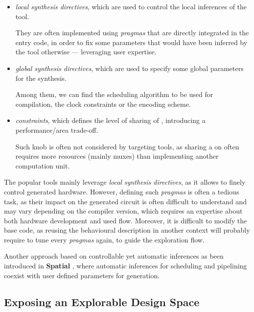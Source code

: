 \clearpage

        \begin{itemize}
            \item {\it local synthesis directives}, which are used to control the local inferences of the  tool.

                They are often implemented using {\it pragmas} that are directly integrated in the entry code, in order to fix some parameters that would have been inferred by the tool otherwise --- leveraging user expertise.
            \item {\it global synthesis directives}, which are used to specify some global parameters for the synthesis.

                Among them, we can find the scheduling algorithm to be used for compilation, the clock constraints or the  encoding scheme.
            \item {\it {} constraints}, which defines the level of sharing of , introducing a performance/area trade-off.

                Such knob is often not considered by  targeting  tools, as sharing a  on  often requires more resources (mainly muxes) than implementing another computation unit.%
        \end{itemize}

        The popular  tools mainly leverage {\it local synthesis directives}, as it allows to finely control generated hardware.
        However, defining such {\it pragmas} is often a tedious task, as their impact on the generated circuit is often difficult to understand and may vary depending on the compiler version, which requires an expertise about both hardware development and used  flow.
        Moreover, it is difficult to modify the base code, as reusing the behavioural description in another context will probably require to tune every {\it pragmas} again, to guide the exploration flow.

        Another approach based on controllable yet automatic inferences as been introduced in {\bf Spatial} \cite{koeplinger_spatial_2018}, where automatic inferences for scheduling and pipelining coexist with user defined parameters for generation.

    \subsection{Exposing an Explorable Design Space}

